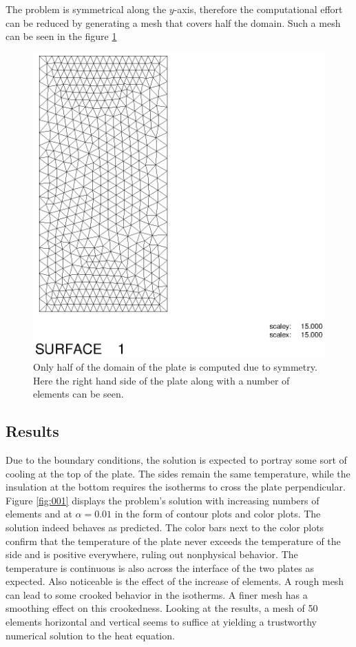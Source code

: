 \documentclass[10pt,a4paper]{article}
\begin{document}
The problem is symmetrical along the $y$-axis, therefore the computational effort can be reduced by generating a mesh that covers half the domain. Such a mesh can be seen in the figure \ref{fig:mesh}
\begin{figure}[h]
\centering
\includegraphics[width=0.7\linewidth]{mesh}
\caption{Only half of the domain of the plate is computed due to symmetry. Here the right hand side of the plate along with a number of elements can be seen.}
\label{fig:mesh}
\end{figure}

\subsection{Results}
Due to the boundary conditions, the solution is expected to portray some sort of cooling at the top of the plate. The sides remain the same temperature, while the insulation at the bottom requires the isotherms to cross the plate perpendicular. \\


Figure \ref{fig:001} displays the problem's solution with increasing numbers of elements and at $\alpha = 0.01$ in the form of contour plots and color plots. The solution indeed behaves as predicted. The color bars next to the color plots confirm that the temperature of the plate never exceeds the temperature of the side and is positive everywhere, ruling out nonphysical behavior. The temperature is continuous is also across the interface of the two plates as expected.
Also noticeable is the effect of the increase of elements. A rough mesh can lead to some crooked behavior in the isotherms. A finer mesh has a smoothing effect on this crookedness. Looking at the results, a mesh of 50 elements horizontal and vertical seems to suffice at yielding a trustworthy numerical solution to the heat equation.\\
\end{document}
